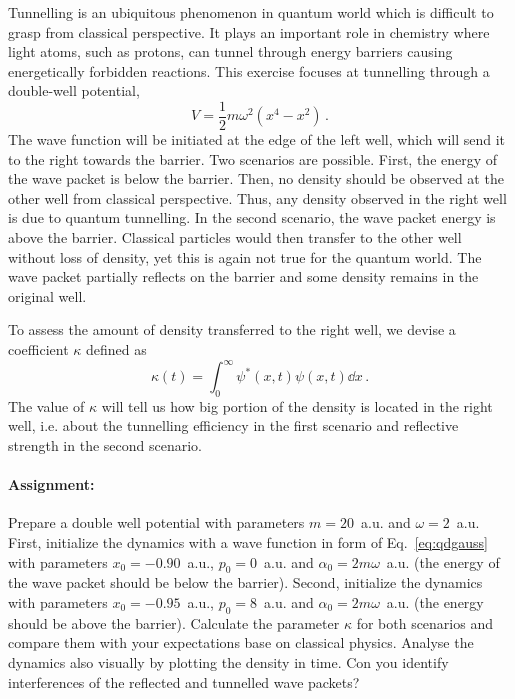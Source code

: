 Tunnelling is an ubiquitous phenomenon in quantum world which is difficult to grasp from classical perspective. It plays an important role in chemistry where light atoms, such as protons, can tunnel through energy barriers causing energetically forbidden reactions. This exercise focuses at tunnelling through a double-well potential,
\begin{equation*}
    V = \frac{1}{2}m\omega^2(x^4 - x^2) \, .
\end{equation*}
The wave function will be initiated at the edge of the left well, which will send it to the right towards the barrier. Two scenarios are possible. First, the energy of the wave packet is below the barrier. Then, no density should be observed at the other well from classical perspective. Thus, any density observed in the right well is due to quantum tunnelling. In the second scenario, the wave packet energy is above the barrier. Classical particles would then transfer to the other well without loss of density, yet this is again not true for the quantum world. The wave packet partially reflects on the barrier and some density remains in the original well.

To assess the amount of density transferred to the right well, we devise a coefficient $\kappa$ defined as
\begin{equation*}
    \kappa(t) = \int_0^{\infty} \psi^*(x,t) \psi(x,t) \dd x \,.
\end{equation*}
The value of $\kappa$ will tell us how big portion of the density is located in the right well, i.e. about the tunnelling efficiency in the first scenario and reflective strength in the second scenario.

\paragraph{Assignment:} Prepare a double well potential with parameters $m=20$~a.u. and $\omega=2$~a.u. First, initialize the dynamics with a wave function in form of Eq.~\eqref{eq:qdgauss} with parameters $x_0=-0.90$~a.u., $p_0=0$~a.u. and $\alpha_0 = 2m\omega$~a.u. (the energy of the wave packet should be below the barrier). Second, initialize the dynamics with parameters $x_0=-0.95$~a.u., $p_0=8$~a.u. and $\alpha_0=2m\omega$~a.u. (the energy should be above the barrier). Calculate the parameter $\kappa$ for both scenarios and compare them with your expectations base on classical physics. Analyse the dynamics also visually by plotting the density in time. Con you identify interferences of the reflected and tunnelled wave packets?


